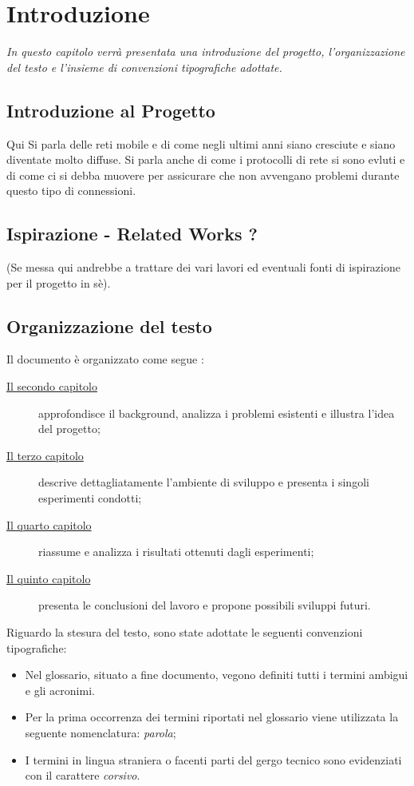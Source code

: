 \chapter{Introduzione}
\label{cap:introduzione}

\textit{\indent In questo capitolo verrà presentata una introduzione del progetto, l'organizzazione del testo e l'insieme di convenzioni tipografiche adottate.
}
\section{Introduzione al Progetto}

Qui Si parla delle reti mobile e di come negli ultimi anni siano cresciute e siano diventate molto diffuse. Si parla anche di come i protocolli di rete si sono evluti e di come ci si debba muovere per assicurare che non avvengano problemi durante questo tipo di connessioni. 


\section{Ispirazione - Related Works ?}

(Se messa qui andrebbe a trattare dei vari lavori ed eventuali fonti di ispirazione per il progetto in sè).

\section{Organizzazione del testo}

\indent Il documento è organizzato come segue :
\begin{description}
    \item[{\hyperref[cap:descrizione]{Il secondo capitolo}}] approfondisce il background, analizza i problemi esistenti e illustra l'idea del progetto;
    
    \item[{\hyperref[cap:processi-metodologie]{Il terzo capitolo}}] descrive dettagliatamente l'ambiente di sviluppo e presenta i singoli esperimenti condotti;

    \item[{\hyperref[cap:risultati]{Il quarto capitolo}}] riassume e analizza i risultati ottenuti dagli esperimenti;
    
    \item[{\hyperref[cap:conclusioni]{Il quinto capitolo}}] presenta le conclusioni del lavoro e propone possibili sviluppi futuri.
\end{description}

Riguardo la stesura del testo, sono state adottate le seguenti convenzioni tipografiche:
\begin{itemize}
	\item Nel glossario, situato a fine documento, vegono definiti tutti i termini ambigui e gli acronimi.
	\item Per la prima occorrenza dei termini riportati nel glossario viene utilizzata la seguente nomenclatura: \emph{parola}\glsfirstoccur;
	\item I termini in lingua straniera o facenti parti del gergo tecnico sono evidenziati con il carattere \emph{corsivo}.
\end{itemize}
